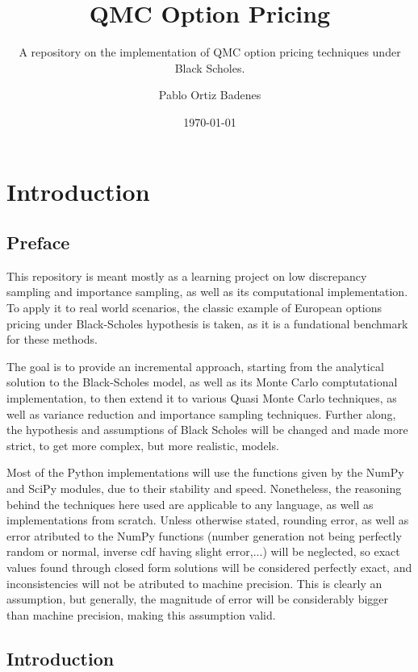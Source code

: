 \documentclass[11pt,oneside,parskip=half]{scrbook}  %
\title{\Huge\bfseries\sffamily QMC Option Pricing}
\subtitle{\large A repository on the implementation of QMC option pricing techniques under Black Scholes.}
\author{Pablo Ortiz Badenes}
\date{\today}
\begin{document}
\frontmatter
\maketitle
\tableofcontents
\listoffigures

\mainmatter

\chapter{Introduction}
\section{Preface}

This repository is meant mostly as a learning project on low discrepancy sampling and importance sampling, as well as its computational implementation. To apply it to real world scenarios, the classic example of European options pricing under Black-Scholes hypothesis is taken, as it is a fundational benchmark for these methods.

The goal is to provide an incremental approach, starting from the analytical solution to the Black-Scholes model, as well as its Monte Carlo comptutational implementation, to then extend it to various Quasi Monte Carlo techniques, as well as variance reduction and importance sampling techniques. Further along, the hypothesis and assumptions of Black Scholes will be changed and made more strict, to get more complex, but more realistic, models.

Most of the Python implementations will use the functions given by the NumPy and SciPy modules, due to their stability and speed. Nonetheless, the reasoning behind the techniques here used are applicable to any language, as well as implementations from scratch. Unless otherwise stated, rounding error, as well as error atributed to the NumPy functions (number generation not being perfectly random or normal, inverse cdf having slight error,...) will be neglected, so exact values found through closed form solutions will be considered perfectly exact, and inconsistencies will not be atributed to machine precision. This is clearly an assumption, but generally, the magnitude of error will be considerably bigger than machine precision, making this assumption valid.

\section{Introduction}
\end{document}
